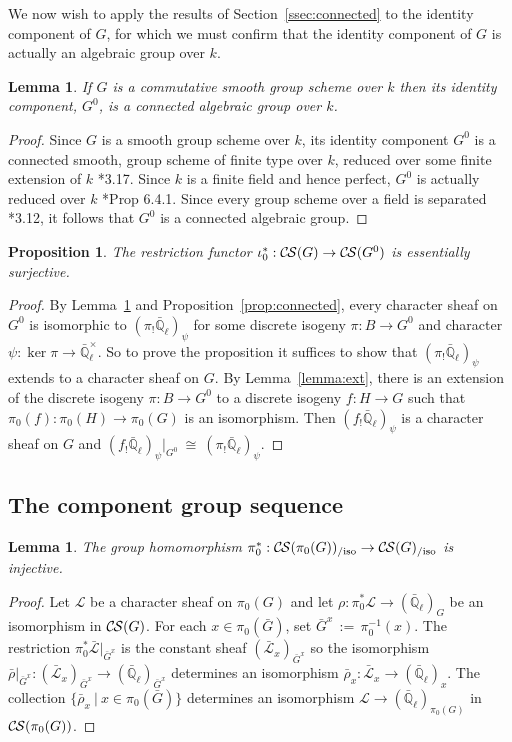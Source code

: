 \documentclass[10pt]{amsart}
\theoremstyle{plain}
\newtheorem{proposition}[theorem]{Proposition}
\newtheorem{lemma}[theorem]{Lemma}
\theoremstyle{definition}
\newcommand{\EE}{\mathbb{\bar Q}_\ell}
\newcommand{\Fq}{k}
\newcommand{\EEx}{\EE^\times}
\newcommand{\ceq}{{\, :=\, }}
\newcommand{\tq}{{\ \vert\ }}
\newcommand{\iso}{{\ \cong\ }}
\newcommand{\cs}[1]{{\mathcal{#1}}}
\newcommand{\gcs}[1]{{\mathcal{\bar #1}}}
\newcommand{\CS}{{\mathcal{C\hskip-0.8pt S}}}
\newcommand{\CSiso}[1]{\CS(#1)_{/\text{iso}}}
\newcommand{\bG}{\bar{G}}
\newcommand{\brho}{{\bar\rho}}
\begin{document}
We now wish to apply the results of Section~\ref{ssec:connected} to the identity component of $G$,
for which we must confirm that the identity component of $G$ is actually an algebraic group over $\Fq$.

\begin{lemma} \label{lem:G0alg-grp}
If $G$ is a commutative smooth group scheme over $\Fq$ then its identity component, $G^0$, is a connected algebraic group over $\Fq$.
\end{lemma}
\begin{proof}
 Since $G$ is a smooth group scheme over $\Fq$, its
 identity component $G^0$ is a connected smooth,
 group scheme of finite type over $\Fq$, reduced over some finite extension of $\Fq$
 \cite{vdGeer-Moonen:AbelianVarieties}*{3.17}.
 Since $\Fq$ is a finite field and hence perfect, $G^0$ is actually reduced over $\Fq$
 \cite{EGAIV2}*{Prop 6.4.1}.  Since every group scheme over a field is separated
 \cite{vdGeer-Moonen:AbelianVarieties}*{3.12},
 it follows that $G^0$ is a connected algebraic group.
\end{proof}

\begin{proposition}\label{prop:restriction}
The restriction functor $\iota_0^* : \CS(G)\to \CS(G^0)$ is essentially surjective.
\end{proposition}

\begin{proof}
  By Lemma~\ref{lem:G0alg-grp} and Proposition~\ref{prop:connected}, every
  character sheaf on $G^0$ is isomorphic to $(\pi_! \EE)_\psi$ for some discrete isogeny $\pi : B \to G^0$ and character $\psi : \ker \pi \to \EEx$.
  So to prove the proposition it suffices to show that $(\pi_! \EE)_\psi$ extends to a character sheaf on $G$.
%
 By Lemma~\ref{lemma:ext}, there is an extension of the
 discrete isogeny $\pi : B \to G^0$ to a discrete isogeny $f : H \to G$
 such that $\pi_0(f) : \pi_0(H)\to \pi_0(G)$ is an isomorphism.
 Then $(f_! \EE)_\psi$ is a character sheaf on $G$ and
 $(f_! \EE)_\psi\vert_{G^0} \iso (\pi_! \EE)_\psi$.
\end{proof}

\subsection{The component group sequence} \label{ssec:component}

\begin{lemma}\label{lem:extension}
The group homomorphism $\pi_0^*: \CSiso{\pi_0(G)} \to \CSiso{G}$ is injective.
\end{lemma}
\begin{proof}
Let $\cs{L}$ be a character sheaf on $\pi_0(G)$ and let $\rho : \pi_0^*\cs{L} \to (\EE)_{G}$ be an isomorphism in $\CS(G)$. 
For each $x\in \pi_0(\bG)$, set $\bG^x \ceq \pi_0^{-1}(x)$.
The restriction $\pi_0^*\gcs{L}\vert_{\bG^x}$ is the constant sheaf $(\gcs{L}_x)_{\bG^x}$ so the isomorphism
$\brho\vert_{\bG^x} : (\gcs{L}_x)_{\bG^x} \to (\EE)_{\bG^x}$ determines an isomorphism $\brho_x : \gcs{L}_x \to (\EE)_x$.
The collection $\{ \brho_x \tq x\in \pi_0(\bG) \}$ determines an isomorphism $\cs{L} \to (\EE)_{\pi_0(G)}$  in $\CS(\pi_0(G))$.
\end{proof}
\end{document}
